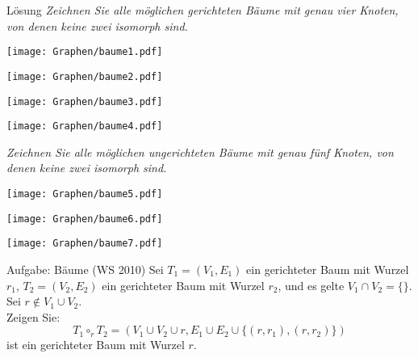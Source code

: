 \begin{frame}{Lösung}
	\textit{Zeichnen Sie alle möglichen gerichteten Bäume mit genau vier Knoten, von denen keine zwei isomorph sind.} \pause
	\begin{center}
		\begin{minipage}{0.3\linewidth}
			\vspace*{\fill}
			\centering
			\texttt{[image: Graphen/baume1.pdf]} 
			\vfill
		\end{minipage}
		\begin{minipage}{0.2\linewidth}
			\vspace*{\fill}
			\centering
			\texttt{[image: Graphen/baume2.pdf]} 
			\vfill
		\end{minipage}
		\begin{minipage}{0.2\linewidth}
			\vspace*{\fill}
			\centering
			\texttt{[image: Graphen/baume3.pdf]} 
			\vfill
		\end{minipage}
		\begin{minipage}{0.2\linewidth}
			\vspace*{\fill}
			\centering
			\texttt{[image: Graphen/baume4.pdf]} 
			\vfill
		\end{minipage}
	\end{center} \pause
	\textit{Zeichnen Sie alle möglichen ungerichteten Bäume mit genau fünf Knoten, von denen keine zwei isomorph sind.} \pause
	\begin{center}
		\begin{minipage}{0.2\linewidth}
			\vspace*{\fill}
			\centering
			\texttt{[image: Graphen/baume5.pdf]} 
			\vfill
		\end{minipage}
		\begin{minipage}{0.25\linewidth}
			\vspace*{\fill}
			\centering
			\texttt{[image: Graphen/baume6.pdf]} 
			\vfill
		\end{minipage}
		\begin{minipage}{0.35\linewidth}
			\vspace*{\fill}
			\centering
			\texttt{[image: Graphen/baume7.pdf]} 
			\vfill
		\end{minipage}
	\end{center}
\end{frame}


\begin{frame}{Aufgabe: Bäume (WS 2010)}
	Sei $T_1 = (V_1 , E_1 )$ ein gerichteter Baum mit Wurzel $r_1$, $T_2 = (V_2 , E_2 )$ ein gerichteter Baum mit Wurzel $r_2$, und es gelte $V_1 \cap V_2 = \{\}$. Sei $r \not\in V_1 \cup V_2$. \\
Zeigen Sie: $$T_1 \circ_r T_2 = (V_1 \cup V_2 \cup {r}, E_1 \cup E_2 \cup \{(r, r_1 ), (r, r_2 )\})$$ ist ein gerichteter Baum mit Wurzel $r$.
\end{frame}

